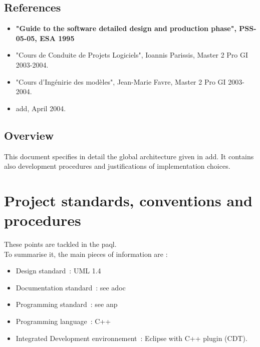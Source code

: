 \subsection{References}
\label{Sec:DDD-References}

\begin{itemize}

\item \textbf{"Guide to the software detailed design and production phase", PSS-05-05, ESA 1995}
\item "Cours de Conduite de Projets Logiciels", Ioannis Parissis, Master 2 Pro GI 2003-2004.
\item "Cours d'Ing\'enirie des mod\`eles", Jean-Marie Favre, Master 2 Pro GI 2003-2004.
\item \ac{add}, April 2004.

\end{itemize}



\subsection{Overview}
\label{Sec:DDD-Overview}

This document specifies in detail the global architecture given in \ac{add}. It contains also development procedures and justifications of implementation choices.


\section{Project standards, conventions and procedures}
\label{Sec:DDD-ProjectStandards}
%

These points are tackled in the \ac{paql}.\\

To summarise it, the main pieces of information are :

\begin{itemize}

\item Design standard~: UML 1.4
\item Documentation standard~: see \ac{adoc}
\item Programming standard~: see \ac{anp}
\item Programming language~: C++
\item Integrated Development environnement~: Eclipse with C++ plugin (CDT).

\end{itemize}
